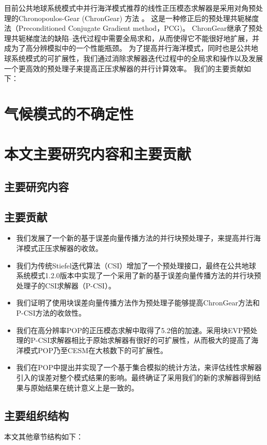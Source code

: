 目前公共地球系统模式中并行海洋模式推荐的线性正压模态求解器是采用对角预处理的Chronopoulos-Gear (ChronGear) 方法
\cite{dAzevedo1999lapack}。 这是一种修正后的预处理共轭梯度法（Preconditioned Conjugate
Gradient method，PCG)。 
ChronGear继承了预处理共轭梯度法的缺陷--迭代过程中需要全局求和，从而使得它不能很好地扩展，并成为了高分辨模拟中的一个性能瓶颈。
为了提高并行海洋模式，同时也是公共地球系统模式的可扩展性，我们通过消除求解器迭代过程中的全局求和操作以及发展一个更高效的预处理子来提高正压求解器的并行计算效率。
我们的主要贡献如下： 
 

\section{气候模式的不确定性}

\section{本文主要研究内容和主要贡献}
\subsection{主要研究内容}
\subsection{主要贡献}
\begin{itemize}
\item  
我们发展了一个新的基于误差向量传播方法的并行块预处理子\cite{roache1995elliptic}，来提高并行海洋模式正压求解器的收敛。 
\item  
我们为传统Stiefel迭代算法（CSI）\cite{hu2013scalable}增加了一个预处理接口，最终在公共地球系统模式1.2.0版本中实现了一个采用了新的基于误差向量传播方法的并行块预处理子的CSI求解器（P-CSI）。
\item  
我们证明了使用块误差向量传播方法作为预处理子能够提高ChronGear方法和P-CSI方法的收敛性。 
\item  
我们在高分辨率POP的正压模态求解中取得了5.2倍的加速。采用块EVP预处理的P-CSI求解器相比于原始求解器有很好的可扩展性，从而极大的提高了海洋模式POP乃至CESM在大核数下的可扩展性。 
\item  
我们在POP中提出并实现了一个基于集合模拟的统计方法，来评估线性求解器引入的误差对整个模式结果的影响。最终确证了采用我们的新的求解器得到结果与原始结果在统计意义上是一致的。 
\end{itemize}
\subsection{主要组织结构}
本文其他章节结构如下：


